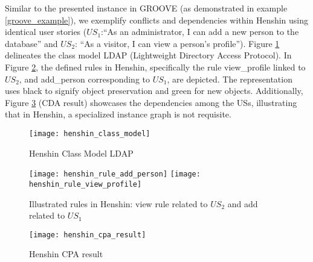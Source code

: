 \begin{example}
Similar to the presented instance in GROOVE (as demonstrated in example \ref{groove_example}), we exemplify conflicts and dependencies within Henshin using identical user stories ($US_1$:\enquote{As an administrator, I can add a new person to the database} and $US_2$: \enquote{As a visitor, I can view a person's proﬁle}). Figure \ref{fig:henshin_model} delineates the  class model LDAP (Lightweight Directory Access Protocol). In Figure \ref{fig:henshin_rule}, the defined rules in Henshin, specifically the rule view\_profile linked to $US_2$, and add\_person corresponding to $US_1$, are depicted. The representation uses black to signify object preservation and green for new objects. Additionally, Figure \ref{henshin_cpa_result} (CDA result) showcases the dependencies among the USs, illustrating that in Henshin, a specialized instance graph is not requisite.
\begin{figure}
\center
\texttt{[image: henshin\_class\_model]}
\caption{Henshin Class Model LDAP}\label{fig:henshin_model}
\end{figure}
\begin{figure}
\texttt{[image: henshin\_rule\_add\_person]}
\texttt{[image: henshin\_rule\_view\_profile]}
\caption{Illustrated rules in Henshin: view rule related to $US_2$ and add related to $US_1$}\label{fig:henshin_rule}
\end{figure}
\begin{figure}
\center
\texttt{[image: henshin\_cpa\_result]}
\caption{Henshin CPA result}\label{henshin_cpa_result}
\end{figure}
\end{example}
